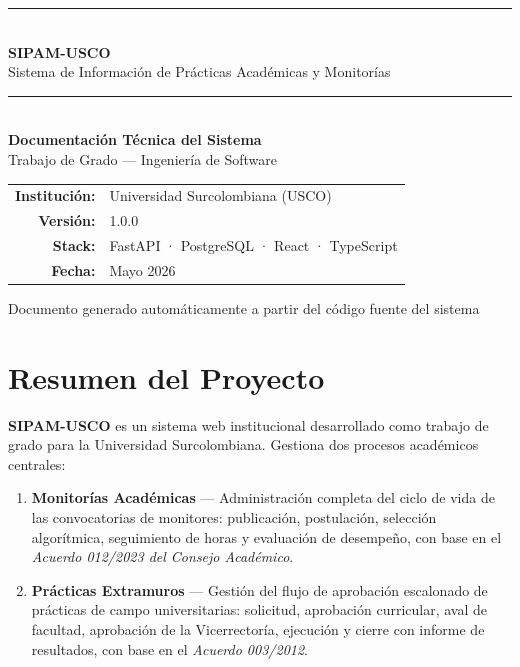 \documentclass[12pt,a4paper]{article}
\begin{document}
\begin{titlepage}
  \centering
  \vspace*{2cm}
  {\color{vinotinto}\rule{\linewidth}{1.5pt}}\\[0.5cm]
  {\Huge\bfseries\color{vinotinto} SIPAM-USCO}\\[0.3cm]
  {\large Sistema de Información de Prácticas Académicas y Monitorías}\\[0.2cm]
  {\color{vinotinto}\rule{\linewidth}{1.5pt}}\\[1cm]
  {\LARGE\bfseries Documentación Técnica del Sistema}\\[0.5cm]
  {\large Trabajo de Grado — Ingeniería de Software}\\[2cm]
  \begin{tabular}{rl}
    \textbf{Institución:} & Universidad Surcolombiana (USCO) \\[0.3cm]
    \textbf{Versión:}     & 1.0.0 \\[0.3cm]
    \textbf{Stack:}       & FastAPI · PostgreSQL · React · TypeScript \\[0.3cm]
    \textbf{Fecha:}       & Mayo 2026 \\
  \end{tabular}
  \vfill
  {\color{grisusco}\small Documento generado automáticamente a partir del código fuente del sistema}
\end{titlepage}

\tableofcontents
\newpage

\section{Resumen del Proyecto}

\textbf{SIPAM-USCO} es un sistema web institucional desarrollado como trabajo de grado para la
Universidad Surcolombiana. Gestiona dos procesos académicos centrales:

\begin{enumerate}
  \item \textbf{Monitorías Académicas} — Administración completa del ciclo de vida de las
        convocatorias de monitores: publicación, postulación, selección algorítmica, seguimiento
        de horas y evaluación de desempeño, con base en el \textit{Acuerdo 012/2023 del Consejo
        Académico}.
  \item \textbf{Prácticas Extramuros} — Gestión del flujo de aprobación escalonado de prácticas
        de campo universitarias: solicitud, aprobación curricular, aval de facultad, aprobación
        de la Vicerrectoría, ejecución y cierre con informe de resultados, con base en el
        \textit{Acuerdo 003/2012}.
\end{enumerate}
\end{document}
